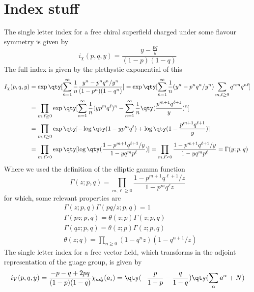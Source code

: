 
\chapter{Index stuff}
The single letter index for a free chiral superfield charged under some flavour symmetry is given by
\begin{equation}
	i_{\chi}(p,q,y)=\frac{y-\frac{pq}{y}}{(1-p)(1-q)}
\end{equation}
The full index is given by the plethystic exponential of this
\begin{equation}
\begin{split}
	I_{\chi}(p,q,y)&=\exp\qty[\sum_{n=1}^{\infty}\frac{1}{n}\frac{y^{n}-p^{n}q^{n}/y^{n}}{(1-p^{n})(1-q^{n})}]=\exp\qty[\sum_{n=1}^{\infty}\frac{1}{n}(y^{n}-p^{n}q^{n}/y^{n})\sum_{m,\ell\ge0}q^{nm}q^{n\ell}]\\
	&=\prod_{m,\ell\ge0}\exp\qty[\sum_{n=1}^{\infty}\frac{1}{n}(yp^{m}q^{\ell})^{n}-\sum_{n=1}^{\infty}\frac{1}{n}\qty(\frac{p^{m+1}q^{\ell+1}}{y})^{n}]\\
	&=\prod_{m,\ell\ge0}\exp\qty[-\log\qty(1-yp^{m}q^{\ell})+\log\qty(1-\frac{p^{m+1}q^{\ell+1}}{y})]\\
	&=\prod_{m,\ell\ge0}\exp\qty[\log\qty(\frac{1-p^{m+1}q^{\ell+1}/y}{1-yq^{m}p^{\ell}})]=\prod_{m,\ell\ge0}\frac{1-p^{m+1}q^{\ell+1}/y}{1-yq^{m}p^{\ell}}=\Gamma(y;p,q)
\end{split}
\end{equation}
Where we used the definition of the elliptic gamma function
\begin{equation}
	\Gamma(z;p,q)=\prod_{m,\ell\ge0}\frac{1-p^{m+1}q^{\ell+1}/z}{1-p^{m}q^{\ell}z}
\end{equation}
for which, some relevant properties are
\begin{equation}
\begin{split}
	&\Gamma(z;p,q)\Gamma(pq/z;p,q)=1\\
	&\Gamma(pz;p,q)=\theta(z;p)\Gamma(z;p,q)\\
	&\Gamma(qz;p,q)=\theta(z;p)\Gamma(z;p,q)\\
	&\theta(z;q)=\prod_{n\ge0}(1-q^{n}z)(1-q^{n+1}/z)
\end{split}
\end{equation}
The single letter index for a free vector field, which transforms in the adjoint representation of the guage group, is given by
\begin{equation}
	i_{V}(p,q,y)=\frac{-p-q+2pq}{(1-p)(1-q)}\chi_{adj}(a_{i})=\qty(-\frac{p}{1-p}-\frac{q}{1-q})\qty(\sum_{\alpha}a^{\alpha}+N)
\end{equation}
